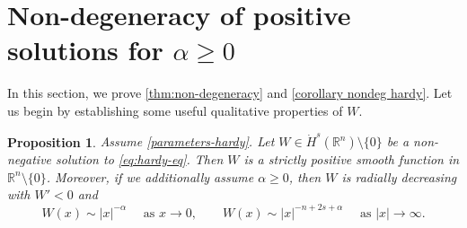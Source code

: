 \documentclass[10pt, reqno]{amsart}
\newcounter{results}[section] %
\theoremstyle{plain}
\newtheorem{proposition}[results]{Proposition}
\theoremstyle{remark}
\theoremstyle{definition}
\numberwithin{equation}{section}
\theoremstyle{plain}
\newcommand{\R}{\ensuremath{\mathbb R}} %
\begin{document}
\section{Non-degeneracy of positive solutions for \texorpdfstring{$\alpha\ge 0$}{alpha non-negative}}
\label{sec:non-degeneracy-proof}

In this section, we prove \cref{thm:non-degeneracy} and \cref{corollary nondeg hardy}. 
Let us begin by establishing some useful qualitative properties of $W$.

\begin{proposition}
\label{prop:W-regularity}
    Assume \cref{parameters-hardy}. Let $W \in \dot H^s(\R^n) \setminus \{0\}$ be a non-negative solution to \eqref{eq:hardy-eq}.
   Then $W$ is a strictly positive smooth function in $\R^n\setminus\{0\}$. 
    Moreover, if we additionally assume $\alpha\ge 0$, then $W$ is radially decreasing with $W'<0$ and 
    \[ W(x) \sim |x|^{-\alpha} \quad \text{ as } x \to 0, \qquad W(x) \sim |x|^{-n + 2s + \alpha} \quad \text{ as } |x| \to \infty. \]
\end{proposition}
\end{document}
